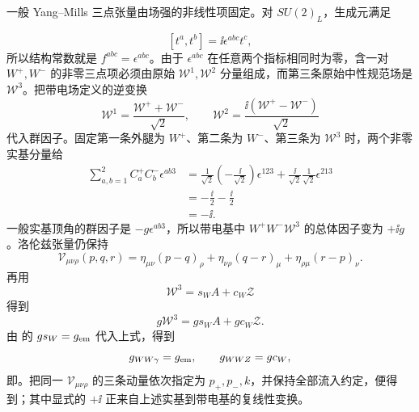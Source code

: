 \begin{derivation}[电弱三规范玻色子顶角]
一般 Yang--Mills 三点张量由场强的非线性项固定。对 $SU(2)_L$，生成元满足

\[
 [t^a,t^b]=\ii\epsilon^{abc}t^c,
\]
所以结构常数就是 $f^{abc}=\epsilon^{abc}$。由于 $\epsilon^{abc}$ 在任意两个指标相同时为零，含一对 $W^+,W^-$ 的非零三点项必须由原始 $\mathcal W^1,\mathcal W^2$ 分量组成，而第三条原始中性规范场是 $\mathcal W^3$。把带电场定义的逆变换
\begin{equation*}
 \mathcal W^1=\frac{\mathcal W^++\mathcal W^-}{\sqrt2},
 \qquad
 \mathcal W^2=\frac{\ii(\mathcal W^+-\mathcal W^-)}{\sqrt2}
\end{equation*}
代入群因子。固定第一条外腿为 $W^+$、第二条为 $W^-$、第三条为 $\mathcal W^3$ 时，两个非零实基分量给
\begin{align*}
 \sum_{a,b=1}^{2}C_a^+C_b^-\epsilon^{ab3}
 &=\frac1{\sqrt2}\left(-\frac{\ii}{\sqrt2}\right)\epsilon^{123}
 +\frac{\ii}{\sqrt2}\frac1{\sqrt2}\epsilon^{213}\\
 &=-\frac{\ii}{2}-\frac{\ii}{2}\\
 &=-\ii.
\end{align*}
一般实基顶角的群因子是 $-g\epsilon^{ab3}$，所以带电基中 $W^+W^-\mathcal W^3$ 的总体因子变为 $+\ii g$。洛伦兹张量仍保持
\begin{equation*}
 \mathcal V_{\mu\nu\rho}(p,q,r)
 =\eta_{\mu\nu}(p-q)_\rho
 +\eta_{\nu\rho}(q-r)_\mu
 +\eta_{\rho\mu}(r-p)_\nu.
\end{equation*}
再用
\begin{equation*}
 \mathcal W^3=s_WA+c_W\mathcal Z
\end{equation*}
得到
\begin{equation*}
 g\mathcal W^3=gs_WA+gc_W\mathcal Z.
\end{equation*}
由 的 $gs_W=g_{\rm em}$ 代入上式，得到
\begin{equation*}
 g_{WW\gamma}=g_{\rm em},
 \qquad
 g_{WWZ}=gc_W,
\end{equation*}
即。把同一 $\mathcal V_{\mu\nu\rho}$ 的三条动量依次指定为 $p_+,p_-,k$，并保持全部流入约定，便得到；其中显式的 $+\ii$ 正来自上述实基到带电基的复线性变换。
\end{derivation}


